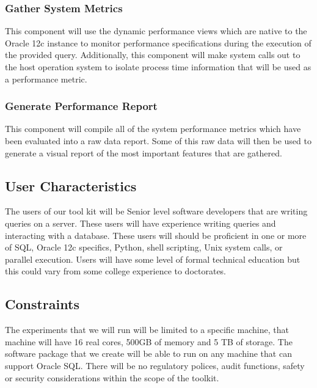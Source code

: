 \documentclass[draftclsnofoot, onecolumn, compsoc, 10pt]{IEEEtran}
\begin{document}
\subsubsection{Gather System Metrics}
This component will use the dynamic performance views which are native to the Oracle 12c instance to monitor performance specifications during the execution of the provided query. 
Additionally, this component will make system calls out to the host operation system to isolate process time information that will be used as a performance metric. 

\subsubsection{Generate Performance Report}
This component will compile all of the system performance metrics which have been evaluated into a raw data report. Some of this raw data will then be used to generate a visual report of the most important features that are gathered.

\subsection{User Characteristics}
The users of our tool kit will be Senior level software developers that are writing queries on a server.
These users will have experience writing queries and interacting with a database.
These users will should be proficient in one or more of SQL, Oracle 12c specifics, Python, shell scripting, Unix system calls, or parallel execution.
Users will have some level of formal technical education but this could vary from some college experience to doctorates.  

\subsection{Constraints}
The experiments that we will run will be limited to a specific machine, that machine will have 16 real cores, 500GB of memory and 5 TB of storage.
The software package that we create  will be able to run on any machine that can support Oracle SQL.
There will be no regulatory polices, audit functions, safety or security considerations within the scope of the toolkit.
\end{document}
